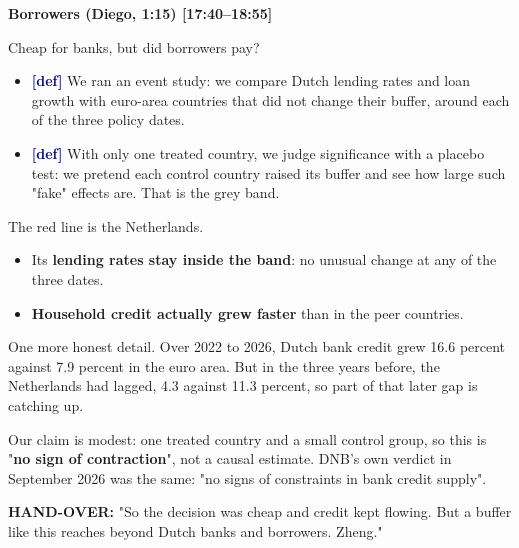 {\small\textbf{Borrowers (Diego, 1:15) [17:40–18:55]}}\par\smallskip
Cheap for banks, but did borrowers pay?
\begin{itemize}\setlength\itemsep{0pt}
\item \textcolor{navy}{\textbf{[def]}} We ran an event study: we compare Dutch lending rates and loan growth with euro-area countries that did not change their buffer, around each of the three policy dates.
\item \textcolor{navy}{\textbf{[def]}} With only one treated country, we judge significance with a placebo test: we pretend each control country raised its buffer and see how large such "fake" effects are. That is the grey band.
\end{itemize}
\par\smallskip
The red line is the Netherlands.
\begin{itemize}\setlength\itemsep{0pt}
\item Its \textbf{lending rates stay inside the band}: no unusual change at any of the three dates.
\item \textbf{Household credit actually grew faster} than in the peer countries.
\end{itemize}
\par\smallskip
One more honest detail. Over 2022 to 2026, Dutch bank credit grew 16.6 percent against 7.9 percent in the euro area. But in the three years before, the Netherlands had lagged, 4.3 against 11.3 percent, so part of that later gap is catching up.
\par\smallskip
Our claim is modest: one treated country and a small control group, so this is "\textbf{no sign of contraction}", not a causal estimate. DNB's own verdict in September 2026 was the same: "no signs of constraints in bank credit supply".
\par\smallskip
\textcolor{nlred}{\textbf{HAND-OVER:}} "So the decision was cheap and credit kept flowing. But a buffer like this reaches beyond Dutch banks and borrowers. Zheng."
